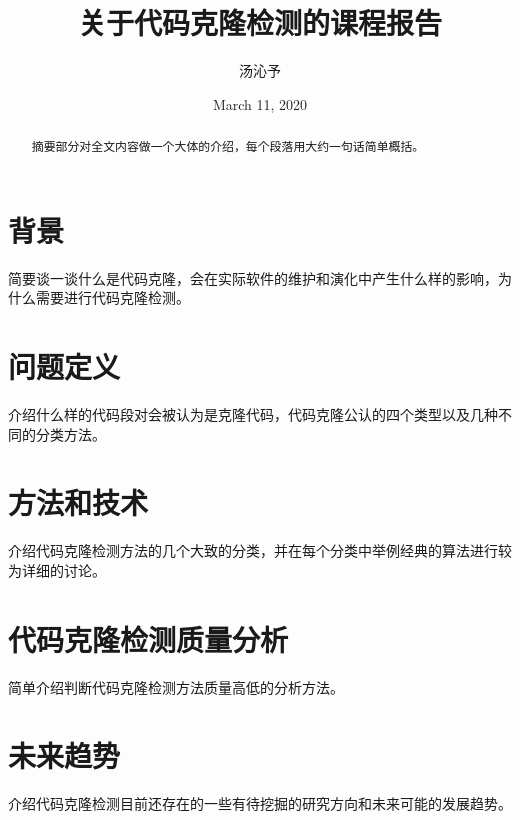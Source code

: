 \documentclass[UTF8]{ctexart}
\begin{document}
	
	\title{关于代码克隆检测的课程报告}
	\author{汤沁予}
	\date{March 11, 2020}
	\maketitle
	
\begin{abstract}
	摘要部分对全文内容做一个大体的介绍，每个段落用大约一句话简单概括。
\end{abstract}

\section{背景}
简要谈一谈什么是代码克隆，会在实际软件的维护和演化中产生什么样的影响，为什么需要进行代码克隆检测。

\section{问题定义}
介绍什么样的代码段对会被认为是克隆代码，代码克隆公认的四个类型以及几种不同的分类方法。

\section{方法和技术}
介绍代码克隆检测方法的几个大致的分类，并在每个分类中举例经典的算法进行较为详细的讨论。

\section{代码克隆检测质量分析}
简单介绍判断代码克隆检测方法质量高低的分析方法。

\section{未来趋势}
介绍代码克隆检测目前还存在的一些有待挖掘的研究方向和未来可能的发展趋势。


\end{document}
